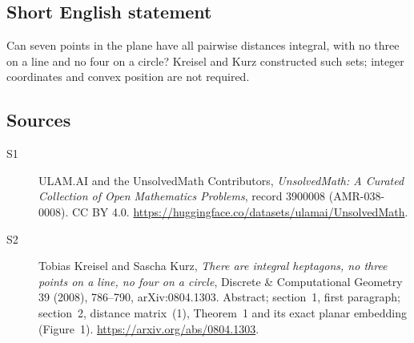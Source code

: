 \documentclass[11pt]{book}
\begin{document}
\subsection{Short English statement}
Can seven points in the plane have all pairwise distances integral, with no three on a line and no four on a circle? Kreisel and Kurz constructed such sets; integer coordinates and convex position are not required.
\subsection{Sources}
\begin{description}
\item[\hypertarget{source:3900008:1}{S1}] ULAM.AI and the UnsolvedMath Contributors, \emph{UnsolvedMath: A Curated Collection of Open Mathematics Problems}, record 3900008 (AMR-038-0008). CC BY 4.0. \url{https://huggingface.co/datasets/ulamai/UnsolvedMath}.
\item[\hypertarget{source:3900008:2}{S2}] Tobias Kreisel and Sascha Kurz, \emph{There are integral heptagons, no three points on a line, no four on a circle}, Discrete \& Computational Geometry 39 (2008), 786--790, arXiv:0804.1303. Abstract; section~1, first paragraph; section~2, distance matrix~(1), Theorem~1 and its exact planar embedding (Figure~1). \url{https://arxiv.org/abs/0804.1303}.
\end{description}
\label{end:3900008}
\end{document}

